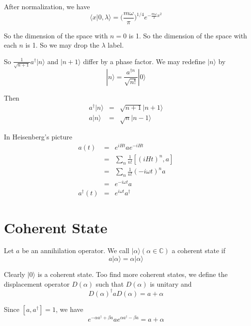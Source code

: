 \documentclass[12pt]{book}
\begin{document}
	After normalization, we have
	\begin{equation}
		\langle x|0,\lambda\rangle=\Big(\frac{m\omega}\pi\Big)^{1/4}e^{-\frac{m\omega}{2}x^2}
	\end{equation}
	
	So the dimension of the space with $n=0$ is 1. So the dimension of the space with each $n$ is 1. So we may drop the $\lambda$ label.
	
	So $\frac 1{\sqrt {n+1}}a^\dagger|n\rangle$ and $|n+1\rangle$ differ by a phase factor.  We may redefine $|n\rangle$ by
	\begin{equation}
		|n\rangle=\frac {a^{\dagger n}}{\sqrt{n!}}|0\rangle
	\end{equation}
	
	Then
	\begin{eqnarray}
		a^\dagger|n\rangle&=&\sqrt {n+1}|n+1\rangle\\
		a|n\rangle&=&\sqrt {n}|n-1\rangle
	\end{eqnarray}
	
	
	In Heisenberg's picture
	\begin{eqnarray}
		a(t)&=&e^{iHt}ae^{-iHt}\\
		&=&\sum_n\frac 1{n!}[(iHt)^n,a]\\
		&=&\sum_n\frac 1{n!}(-i\omega t)^na\\
		&=&e^{-i\omega t}a\\
		a^\dagger(t)&=&e^{i\omega t}a^\dagger
	\end{eqnarray}
	\section{Coherent State}
	
	Let $a$ be an annihilation operator. We call $|\alpha\rangle (\alpha\in\mathbb C)$ a coherent state if 
	\begin{equation}
		a|\alpha\rangle=\alpha|\alpha\rangle
	\end{equation}
	
	Clearly $|0\rangle$ is a coherent state. Too find more coherent states, we define the displacement operator $D(\alpha)$ such that $D(\alpha)$ is unitary and
	\begin{equation}
		D(\alpha)^\dagger a D(\alpha)=a+\alpha
	\end{equation}	
	
	Since $[a,a^\dagger]=1$, we have
	\begin{equation}
		e^{-\alpha a^\dagger+\beta a}ae^{\alpha a^\dagger-\beta a}=a+\alpha
	\end{equation}
	
\end{document}
